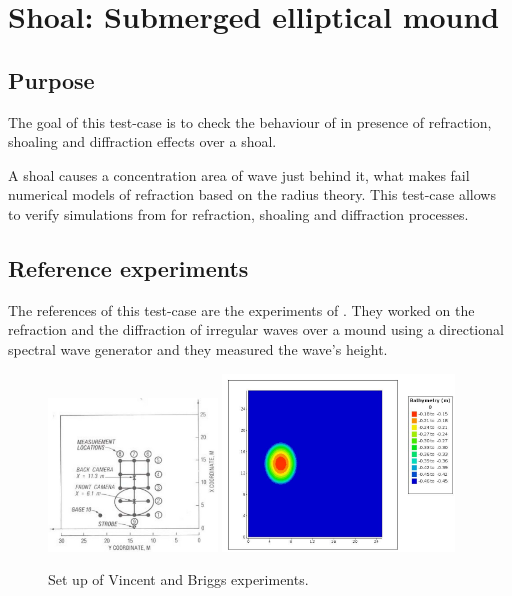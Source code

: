 \chapter{Shoal: Submerged elliptical mound}
%

%
\section{Purpose}
The goal of this test-case is to check the behaviour of \tomawac in presence of
refraction, shoaling and diffraction effects over a shoal.

A shoal causes a concentration area of wave just behind it, what makes fail
numerical models of refraction based on the radius theory. This test-case
allows to verify simulations from \tomawac for refraction, shoaling and
diffraction processes.

\section{Reference experiments}
The references of this test-case are the experiments of \cite{Vincent1989}.
They worked on the refraction and the diffraction of irregular waves over a
mound using a directional spectral wave generator and they measured the wave's
height.

\begin{figure}[h!]
\label{shoalsetup}
  \centering
    \includegraphics[width=0.4\textwidth]{setup.jpg}
      \includegraphics[width=0.55\textwidth]{bathy_shoal.jpg}
      \caption{Set up of Vincent and Briggs experiments.}
\end{figure}

